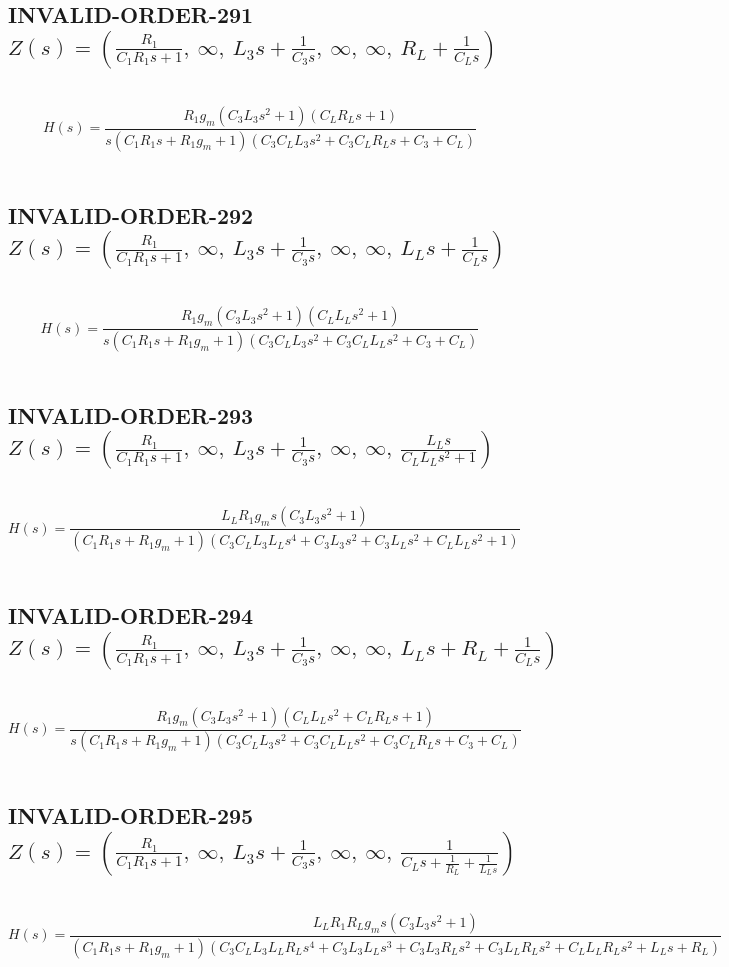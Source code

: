 \documentclass{article}
\begin{document}
\subsection{INVALID-ORDER-291 $Z(s) = \left( \frac{R_{1}}{C_{1} R_{1} s + 1}, \  \infty, \  L_{3} s + \frac{1}{C_{3} s}, \  \infty, \  \infty, \  R_{L} + \frac{1}{C_{L} s}\right)$ } \ 
\textbf{\[H(s) = \frac{R_{1} g_{m} \left(C_{3} L_{3} s^{2} + 1\right) \left(C_{L} R_{L} s + 1\right)}{s \left(C_{1} R_{1} s + R_{1} g_{m} + 1\right) \left(C_{3} C_{L} L_{3} s^{2} + C_{3} C_{L} R_{L} s + C_{3} + C_{L}\right)}\] } \ 
\subsection{INVALID-ORDER-292 $Z(s) = \left( \frac{R_{1}}{C_{1} R_{1} s + 1}, \  \infty, \  L_{3} s + \frac{1}{C_{3} s}, \  \infty, \  \infty, \  L_{L} s + \frac{1}{C_{L} s}\right)$ } \ 
\textbf{\[H(s) = \frac{R_{1} g_{m} \left(C_{3} L_{3} s^{2} + 1\right) \left(C_{L} L_{L} s^{2} + 1\right)}{s \left(C_{1} R_{1} s + R_{1} g_{m} + 1\right) \left(C_{3} C_{L} L_{3} s^{2} + C_{3} C_{L} L_{L} s^{2} + C_{3} + C_{L}\right)}\] } \ 
\subsection{INVALID-ORDER-293 $Z(s) = \left( \frac{R_{1}}{C_{1} R_{1} s + 1}, \  \infty, \  L_{3} s + \frac{1}{C_{3} s}, \  \infty, \  \infty, \  \frac{L_{L} s}{C_{L} L_{L} s^{2} + 1}\right)$ } \ 
\textbf{\[H(s) = \frac{L_{L} R_{1} g_{m} s \left(C_{3} L_{3} s^{2} + 1\right)}{\left(C_{1} R_{1} s + R_{1} g_{m} + 1\right) \left(C_{3} C_{L} L_{3} L_{L} s^{4} + C_{3} L_{3} s^{2} + C_{3} L_{L} s^{2} + C_{L} L_{L} s^{2} + 1\right)}\] } \ 
\subsection{INVALID-ORDER-294 $Z(s) = \left( \frac{R_{1}}{C_{1} R_{1} s + 1}, \  \infty, \  L_{3} s + \frac{1}{C_{3} s}, \  \infty, \  \infty, \  L_{L} s + R_{L} + \frac{1}{C_{L} s}\right)$ } \ 
\textbf{\[H(s) = \frac{R_{1} g_{m} \left(C_{3} L_{3} s^{2} + 1\right) \left(C_{L} L_{L} s^{2} + C_{L} R_{L} s + 1\right)}{s \left(C_{1} R_{1} s + R_{1} g_{m} + 1\right) \left(C_{3} C_{L} L_{3} s^{2} + C_{3} C_{L} L_{L} s^{2} + C_{3} C_{L} R_{L} s + C_{3} + C_{L}\right)}\] } \ 
\subsection{INVALID-ORDER-295 $Z(s) = \left( \frac{R_{1}}{C_{1} R_{1} s + 1}, \  \infty, \  L_{3} s + \frac{1}{C_{3} s}, \  \infty, \  \infty, \  \frac{1}{C_{L} s + \frac{1}{R_{L}} + \frac{1}{L_{L} s}}\right)$ } \ 
\textbf{\[H(s) = \frac{L_{L} R_{1} R_{L} g_{m} s \left(C_{3} L_{3} s^{2} + 1\right)}{\left(C_{1} R_{1} s + R_{1} g_{m} + 1\right) \left(C_{3} C_{L} L_{3} L_{L} R_{L} s^{4} + C_{3} L_{3} L_{L} s^{3} + C_{3} L_{3} R_{L} s^{2} + C_{3} L_{L} R_{L} s^{2} + C_{L} L_{L} R_{L} s^{2} + L_{L} s + R_{L}\right)}\] } \ 
\end{document}
